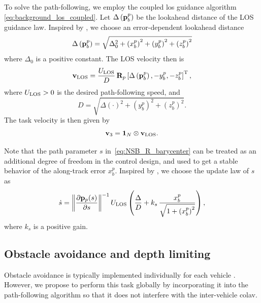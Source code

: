 To solve the path-following, we employ the coupled \gls{los} guidance algorithm \eqref{eq:background_los_coupled}.
Let $\Delta\left(\mathbf{p}_b^p\right)$ be the lookahead distance of the LOS guidance law.
Inspired by \cite{belleter_2019_observer}, we choose an error-dependent lookahead distance 
\begin{equation}
    \Delta\left(\mathbf{p}_b^p\right) = \sqrt{\Delta_0^2 + \left(x_b^p\right)^2 + \left(y_b^p\right)^2 + \left(z_b^p\right)^2}
    \label{eq:NSB_R_delta}
\end{equation}
where $\Delta_0$ is a positive constant.
The LOS velocity then is 
\begin{equation}
    \mathbf{v}_{\rm LOS} = \frac{U_{\rm LOS}}{D} \, \mathbf{R}_p\left[\Delta\left(\mathbf{p}_b^p\right), -y_b^p, -z_b^p\right]^{\mathrm{T}},
    \label{eq:NSB_R_v_LOS}
\end{equation}
where $U_{\rm LOS} > 0$ is the desired path-following speed, and 
\begin{equation}
    D = \sqrt{\Delta(\cdot)^2 + \left(y_b^p\right)^2 + \left(z_b^p\right)^2}.
\end{equation}
The task velocity is then given by 
\begin{equation}
    \mathbf{v}_3 = \mathbf{1}_N \otimes \mathbf{v}_{\rm LOS}.
    \label{eq:NSB_R_v_3}
\end{equation}

Note that the path parameter $s$ in~\eqref{eq:NSB_R_barycenter} can be treated as an additional degree of freedom in the control design, and used to get a stable behavior of the along-track error $x_b^p$. 
Inspired by \cite{belleter_2019_observer}, we choose the update law of $s$ as
\begin{equation}
    \dot{s} = \left\|\frac{\partial \mathbf{p}_p(s)}{\partial s}\right\|^{-1} U_{\rm LOS} \left(\frac{\Delta}{D} + k_{s}\,\frac{x_b^p}{\sqrt{1+\left(x_b^p\right)^2}}\right),\label{eq:NSB_R_path_update}
\end{equation}
where $k_{s}$ is a positive gain.


\subsection{Obstacle avoidance and depth limiting}
\label{sec:NSB_R_OA}

Obstacle avoidance is typically implemented individually for each vehicle \cite{antonelli_2006_kinematic}.
However, we propose to perform this task globally by incorporating it into the path-following algorithm so that it does not interfere with the inter-vehicle \gls{colav}. %

